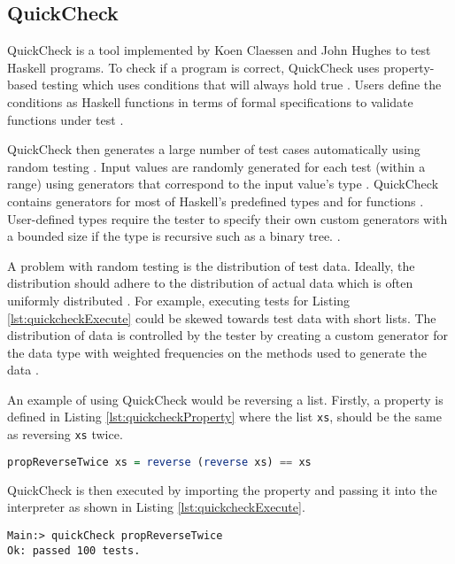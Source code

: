 \subsection{QuickCheck}
QuickCheck is a tool implemented by Koen Claessen and John Hughes \cite{QClightweight} to test Haskell programs.
To check if a program is correct, QuickCheck uses property-based testing which uses conditions that will always hold true \cite{QClightweight}.
Users define the conditions as Haskell functions in terms of formal specifications to validate functions under test \cite{QClightweight}. 

QuickCheck then generates a large number of test cases automatically using random testing \cite{QClightweight}. 
Input values are randomly generated for each test (within a range) using generators that correspond to the input value's type \cite{QClightweight}. 
QuickCheck contains generators for most of Haskell's predefined types and for functions \cite{QClightweight}. 
User-defined types require the tester to specify their own custom generators with a bounded size if the type is recursive such as a binary tree. \cite{QClightweight}. 

A problem with random testing is the distribution of test data. Ideally, the distribution should adhere to the distribution of actual data which is often uniformly distributed \cite{QClightweight}. 
For example, executing tests for Listing \ref{lst:quickcheckExecute} could be skewed towards test data with short lists. 
The distribution of data is controlled by the tester by creating a custom generator for the data type with weighted frequencies on the methods used to generate the data \cite{QClightweight}.

An example of using QuickCheck would be reversing a list.
Firstly, a property is defined in Listing \ref{lst:quickcheckProperty} where the list \texttt{xs}, should be the same as reversing \texttt{xs} twice.

\begin{lstlisting}[language=haskell, label={lst:quickcheckProperty},
caption={Property for reversing a list in QuickCheck}, captionpos=b, frame = single]
propReverseTwice xs = reverse (reverse xs) == xs
\end{lstlisting}

QuickCheck is then executed by importing the property and passing it into the interpreter as shown in Listing \ref{lst:quickcheckExecute}.

\begin{lstlisting}[label={lst:quickcheckExecute}, caption={Executing tests to check a list is reversed}, captionpos=b,
frame = single]
Main:> quickCheck propReverseTwice
Ok: passed 100 tests.
\end{lstlisting}

